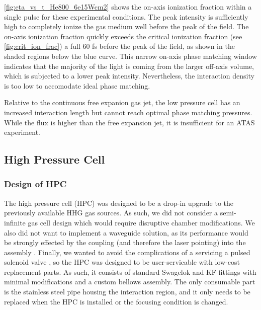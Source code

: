 \cref{fig:eta_vs_t_He800_6e15Wcm2} shows the on-axis ionization fraction within a single pulse for these experimental conditions. The peak intensity is sufficiently high to completely ionize the gas medium well before the peak of the field. The on-axis ionization fraction quickly exceeds the critical ionization fraction (see \cref{fig:crit_ion_frac}) a full 60 fs before the peak of the field, as shown in the shaded regions below the blue curve. This narrow on-axis phase matching window indicates that the majority of the light is coming from the larger off-axis volume, which is subjected to a lower peak intensity. Nevertheless, the interaction density is too low to accomodate ideal phase matching.

Relative to the continuous free expanion gas jet, the low pressure cell has an increased interaction length but cannot reach optimal phase matching pressures. While the flux is higher than the free expansion jet, it is insufficient for an ATAS experiment.

\subsection{High Pressure Cell}
\label{sec:HPC}

\subsubsection{Design of HPC}

The high pressure cell (HPC) was designed to be a drop-in upgrade to the previously available HHG gas sources. As such, we did not consider a semi-infinite gas cell design which would require disruptive chamber modifications. We also did not want to implement a waveguide solution, as its performance would be strongly effected by the coupling (and therefore the laser pointing) into the assembly \cite{popmintchevExtendedPhaseMatching2008,popmintchevPhaseMatchingHigh2009}. Finally, we wanted to avoid the complications of a servicing a pulsed solenoid valve \cite{evenEvenLavieValveSource2015}, so the HPC was designed to be user-servicable with low-cost replacement parts. As such, it consists of standard Swagelok and KF fittings with minimal modifications and a custom bellows assembly. The only consumable part is the stainless steel pipe housing the interaction region, and it only needs to be replaced when the HPC is installed or the focusing condition is changed.

